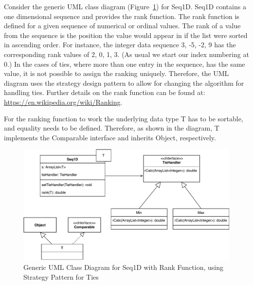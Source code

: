 \documentclass[12pt,fleqn]{examtst}
\begin{document}
Consider the generic UML class diagram (Figure~\ref{Fig_UML_Strategy}) for
Seq1D.  Seq1D contains a one dimensional sequence and provides the rank
function.  The rank function is defined for a given sequence of numerical or
ordinal values.  The rank of a value from the sequence is the position the value
would appear in if the list were sorted in ascending order.  For instance, the
integer data sequence 3, -5, -2, 9 has the corresponding rank values of 2, 0, 1,
3.  (As usual we start our index numbering at 0.)  In the cases of ties, where
more than one entry in the sequence, has the same value, it is not possible to
assign the ranking uniquely.  Therefore, the UML diagram uses the strategy
design pattern to allow for changing the algorithm for handling ties.  Further
details on the rank function can be found at:
\url{https://en.wikipedia.org/wiki/Ranking}.

For the ranking function to work the underlying data type T has to be sortable,
and equality needs to be defined.  Therefore, as shown in the diagram, T
implements the Comparable interface and inherits Object, respectively.

\begin{figure}[!h]
\begin{center}
\includegraphics[scale=1]{Seq1D_StratPattern_UML.pdf}
\end{center}
\caption{Generic UML Class Diagram for Seq1D with Rank Function, using Strategy Pattern
  for Ties} \label{Fig_UML_Strategy}
\end{figure}


\newpage
\end{document}
